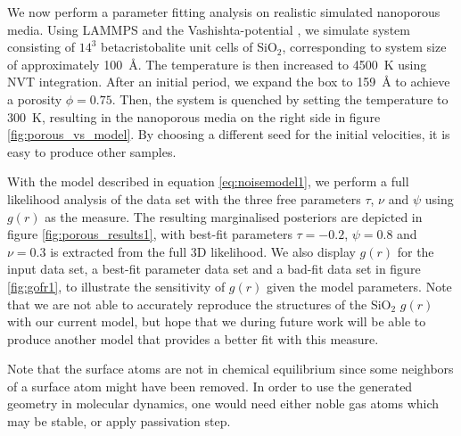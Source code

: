 \documentclass[aps,pre,twocolumn,letterpaper,floatfix,showpacs]{revtex4}
\begin{document}
We now perform a parameter fitting analysis on realistic simulated nanoporous media. Using LAMMPS \cite{plimpton1995fast} and the Vashishta-potential \cite{vashishta1990interaction}, we simulate system consisting of $14^3$ betacristobalite unit cells of SiO$_2$, corresponding to system size of approximately \SI{100}{\angstrom}. The temperature is then increased to \SI{4500}{\kelvin} using NVT integration. After an initial period, we expand the box to \SI{159}{\angstrom} to achieve a porosity $\phi=0.75$. Then, the system is quenched by setting the temperature to \SI{300}{\kelvin}, resulting in the nanoporous media on the right side in figure \ref{fig:porous_vs_model}. By choosing a different seed for the initial velocities, it is easy to produce other samples.

With the model described in equation \ref{eq:noisemodel1}, we perform a full likelihood analysis of the data set with the three free parameters $\tau$, $\nu$ and $\psi$ using $g(r)$ as the measure. The resulting marginalised posteriors are depicted in figure \ref{fig:porous_results1}, with best-fit parameters $\tau=-0.2$, $\psi=0.8$ and $\nu=0.3$ is extracted from the full 3D likelihood. We also display $g(r)$ for the input data set, a best-fit parameter data set and a bad-fit data set in figure \ref{fig:gofr1}, to illustrate the sensitivity of $g(r)$ given the model parameters. Note that we are not able to accurately reproduce the structures of the SiO$_2$ $g(r)$ with our current model, but hope that we during future work will be able to produce another model that provides a better fit with this measure. 

Note that the surface atoms are not in chemical equilibrium since some neighbors of a surface atom might have been removed. In order to use the generated geometry in molecular dynamics, one would need either noble gas atoms which may be stable, or apply passivation step.
\end{document}
